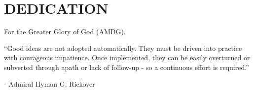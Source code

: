 %
%
%

\chapter*{DEDICATION}

\begin{center}
\vspace{60 mm}
For the Greater Glory of God (AMDG).

\vspace{80 mm}
``Good ideas are not adopted automatically. They must be driven into practice with courageous impatience. Once implemented, they can be easily overturned or subverted through apath or lack of follow-up - so a continuous effort is required.''

- Admiral Hyman G. Rickover

\end{center}
\pagebreak{}
